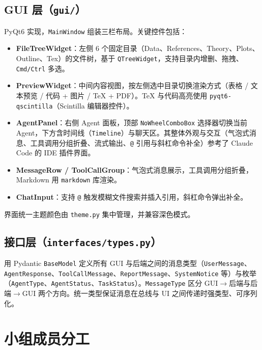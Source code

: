 \documentclass[a4paper,11pt]{article}
\begin{document}
\subsection{GUI 层（\texttt{gui/}）}

PyQt6 实现，\texttt{MainWindow} 组装三栏布局。关键控件包括：

\begin{itemize}[leftmargin=1.4em,itemsep=2pt]
  \item \textbf{FileTreeWidget}：左侧 6 个固定目录（Data、References、Theory、Plots、Outline、Tex）的文件树，基于 \texttt{QTreeWidget}，支持目录内增删、拖拽、\texttt{Cmd/Ctrl} 多选。
  \item \textbf{PreviewWidget}：中间内容视图，按左侧选中目录切换渲染方式（表格 / 文本预览 / 代码 + 图片 / TeX + PDF）。TeX 与代码高亮使用 \texttt{pyqt6-qscintilla}（Scintilla 编辑器控件）。
  \item \textbf{AgentPanel}：右侧 Agent 面板，顶部 \texttt{NoWheelComboBox} 选择器切换当前 Agent，下方含时间线（\texttt{Timeline}）与聊天区。其整体外观与交互（气泡式消息、工具调用分组折叠、流式输出、\texttt{@} 引用与斜杠命令补全）参考了 Claude Code\cite{claudecode} 的 IDE 插件界面。
  \item \textbf{MessageRow / ToolCallGroup}：气泡式消息展示，工具调用分组折叠，Markdown 用 \texttt{markdown} 库渲染。
  \item \textbf{ChatInput}：支持 \texttt{@} 触发模糊文件搜索并插入引用，斜杠命令弹出补全。
\end{itemize}

界面统一主题颜色由 \texttt{theme.py} 集中管理，并兼容深色模式。

\subsection{接口层（\texttt{interfaces/types.py}）}

用 Pydantic \texttt{BaseModel} 定义所有 GUI 与后端之间的消息类型（\texttt{UserMessage}、\texttt{AgentResponse}、\texttt{ToolCallMessage}、\texttt{ReportMessage}、\texttt{SystemNotice} 等）与枚举（\texttt{AgentType}、\texttt{AgentStatus}、\texttt{TaskStatus}）。\texttt{MessageType} 区分 GUI$\rightarrow$后端与后端$\rightarrow$GUI 两个方向。统一类型保证消息在总线与 UI 之间传递时强类型、可序列化。

\section{小组成员分工}
\end{document}
